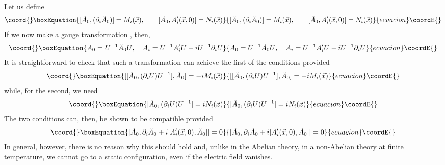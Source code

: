 \documentclass[a4paper,12pt]{article}
\begin{document}
Let us define
\begin{equation}\coord{}\boxEquation{
[\tilde{A}_{0},(\partial_{i}\tilde{A}_{0})] = M_{i}(\vec{x}),\qquad
[\tilde{A}_{0}, A'_{i}(\vec{x},0)] = N_{i}(\vec{x})
}{
[\tilde{A}_{0},(\partial_{i}\tilde{A}_{0})] = M_{i}(\vec{x}),\qquad
[\tilde{A}_{0}, A'_{i}(\vec{x},0)] = N_{i}(\vec{x})
}{ecuacion}\coordE{}\end{equation}
If we now make a gauge transformation \coordHE{}, then,
\begin{equation}\coord{}\boxEquation{
\bar{A}_{0} = \bar{U}^{-1}\tilde{A}_{0}\bar{U},\quad \bar{A}_{i} =
\bar{U}^{-1}A'_{i}\bar{U} - i\bar{U}^{-1}\partial_{i}\bar{U}
}{
\bar{A}_{0} = \bar{U}^{-1}\tilde{A}_{0}\bar{U},\quad \bar{A}_{i} =
\bar{U}^{-1}A'_{i}\bar{U} - i\bar{U}^{-1}\partial_{i}\bar{U}
}{ecuacion}\coordE{}\end{equation}
It is straightforward to check that such a transformation can achieve
the first of the conditions provided
\begin{equation}\coord{}\boxEquation{
[[\tilde{A}_{0},(\partial_{i}\bar{U})\bar{U}^{-1}],\tilde{A}_{0}] =
-i M_{i}(\vec{x})
}{
[[\tilde{A}_{0},(\partial_{i}\bar{U})\bar{U}^{-1}],\tilde{A}_{0}] =
-i M_{i}(\vec{x})
}{ecuacion}\coordE{}\end{equation}
while, for the second, we need
\begin{equation}\coord{}\boxEquation{
[\tilde{A}_{0}, (\partial_{i}\bar{U})\bar{U}^{-1}] = i N_{i}(\vec{x})
}{
[\tilde{A}_{0}, (\partial_{i}\bar{U})\bar{U}^{-1}] = i N_{i}(\vec{x})
}{ecuacion}\coordE{}\end{equation}
The two conditions can, then, be shown to be compatible provided
\begin{equation}\coord{}\boxEquation{
[\tilde{A}_{0}, \partial_{i}\tilde{A}_{0} +
i[A'_{i}(\vec{x},0),\tilde{A}_{0}]] = 0
}{
[\tilde{A}_{0}, \partial_{i}\tilde{A}_{0} +
i[A'_{i}(\vec{x},0),\tilde{A}_{0}]] = 0
}{ecuacion}\coordE{}\end{equation}
In general, however, there is no reason why this should
hold and, unlike in the Abelian theory, in a non-Abelian theory at
finite temperature, we cannot go to a static configuration, even if
the electric field vanishes.
\end{document}
